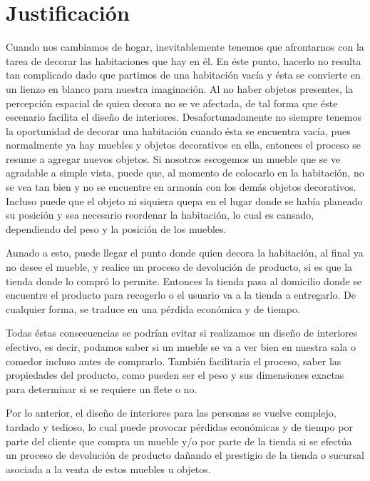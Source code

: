 \section{Justificación}
Cuando nos cambiamos de hogar, inevitablemente tenemos que afrontarnos con la tarea de decorar las habitaciones que hay en él. En éste punto, hacerlo no resulta tan complicado dado que partimos de una habitación vacía y ésta se convierte en un lienzo en blanco para nuestra imaginación. Al no haber objetos presentes, la percepción espacial de quien decora no se ve afectada, de tal forma que éste escenario facilita el diseño de interiores. Desafortunadamente no siempre tenemos la oportunidad de decorar una habitación cuando ésta se encuentra vacía, pues normalmente ya hay muebles y objetos decorativos en ella, entonces el proceso se resume a agregar nuevos objetos. Si nosotros escogemos un mueble que se ve agradable a simple vista, puede que, al momento de colocarlo en la habitación, no se vea tan bien y no se encuentre en armonía con los demás objetos decorativos. Incluso puede que el objeto ni siquiera quepa en el lugar donde se había planeado su posición y sea necesario reordenar la habitación, lo cual es cansado, dependiendo del peso y la posición de los muebles.\par 
Aunado a esto, puede llegar el punto donde quien decora la habitación, al final ya no desee el mueble, y realice un proceso de devolución de producto, si es que la tienda donde lo compró lo permite. Entonces la tienda pasa al domicilio donde se encuentre el producto para recogerlo o el usuario va a la tienda a entregarlo. De cualquier forma, se traduce en una pérdida económica y de tiempo.\par 
Todas éstas consecuencias se podrían evitar si realizamos un diseño de interiores efectivo, es decir, podamos saber si un mueble se va a ver bien en nuestra sala o comedor incluso antes de comprarlo. También facilitaría el proceso, saber las propiedades del producto, como pueden ser el peso y sus dimensiones exactas para determinar si se requiere un flete o no.\par 
Por lo anterior, el diseño de interiores  para las personas se vuelve complejo, tardado y tedioso, lo cual puede provocar pérdidas económicas y de tiempo por parte del cliente que compra un mueble y/o por parte de la tienda si se efectúa un proceso de devolución de producto dañando el prestigio de la tienda o sucursal asociada a la venta de estos muebles u objetos.
